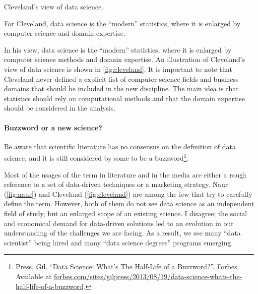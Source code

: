 \begin{figurebox}[label=fig:cleveland]{Cleveland's view of data science.}
  \centering
  \tcblower
    For Cleveland, data science is the ``modern'' statistics,
    where it is enlarged by computer science and domain expertise.
\end{figurebox}

In his view, data science is the ``modern'' statistics, where it is enlarged by computer
science methods and domain expertise.  An illustration of Cleveland's view of data science
is shown in \cref{fig:cleveland}.  It is important to note that Cleveland never defined a
explicit list of computer science fields and business domains that should be included in
the new discipline.  The main idea is that statistics should rely on computational methods
and that the domain expertise should be considered in the analysis.

\paragraph{Buzzword or a new science?}

Be aware that scientific literature has no consensus on the definition of data science, and it is still considered
by some to be a buzzword\footnote{Press, Gil. ``Data Science: What's The Half-Life of a
Buzzword?''. Forbes. Available at
\href{https://www.forbes.com/sites/gilpress/2013/08/19/data-science-whats-the-half-life-of-a-buzzword/}%
  {forbes.com/sites/gilpress/2013/08/19/data-science-whats-the-half-life-of-a-buzzword}.}.

Most of the usages of the term in literature and in the media are either a rough
reference to a set of data-driven techniques or a marketing strategy.  Naur
(\cref{fig:naur}) and Cleveland (\cref{fig:cleveland}) are among the few that try to
carefully define the term.  However, both of them do not see data science as an
independent field of study, but an enlarged scope of an existing science.  I disagree;
the social and economical demand for data-driven solutions led to an evolution in our
understanding of the challenges we are facing.  As a result, we see many ``data
scientist'' being hired and many ``data science degrees'' programs emerging.

